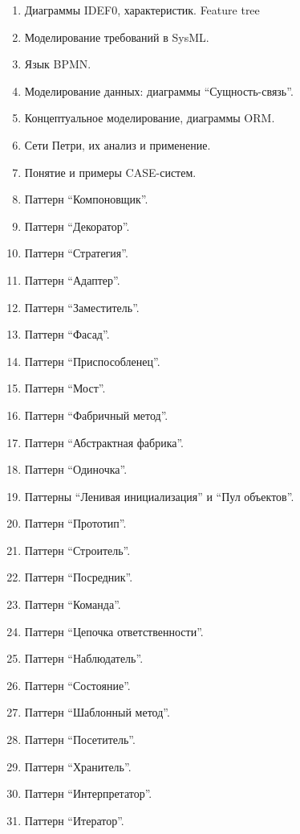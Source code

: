 \documentclass[a5paper]{article}
\begin{document}
\begin{enumerate}
    \item Диаграммы IDEF0, характеристик. Feature tree 
    \item Моделирование требований в SysML.
    \item Язык BPMN.
    \item Моделирование данных: диаграммы \enquote{Сущность-связь}.
    \item Концептуальное моделирование, диаграммы ORM.
    \item Сети Петри, их анализ и применение.
    \item Понятие и примеры CASE-систем.
    \item Паттерн \enquote{Компоновщик}.
    \item Паттерн \enquote{Декоратор}.
    \item Паттерн \enquote{Стратегия}.
    \item Паттерн \enquote{Адаптер}.
    \item Паттерн \enquote{Заместитель}.
    \item Паттерн \enquote{Фасад}.
    \item Паттерн \enquote{Приспособленец}.
    \item Паттерн \enquote{Мост}.
    \item Паттерн \enquote{Фабричный метод}.
    \item Паттерн \enquote{Абстрактная фабрика}.
    \item Паттерн \enquote{Одиночка}.
    \item Паттерны \enquote{Ленивая инициализация} и \enquote{Пул объектов}.
    \item Паттерн \enquote{Прототип}.
    \item Паттерн \enquote{Строитель}.
    \item Паттерн \enquote{Посредник}.
    \item Паттерн \enquote{Команда}.
    \item Паттерн \enquote{Цепочка ответственности}.
    \item Паттерн \enquote{Наблюдатель}.
    \item Паттерн \enquote{Состояние}.
    \item Паттерн \enquote{Шаблонный метод}.
    \item Паттерн \enquote{Посетитель}.
    \item Паттерн \enquote{Хранитель}.
    \item Паттерн \enquote{Интерпретатор}.
    \item Паттерн \enquote{Итератор}.

\end{enumerate}
\end{document}
